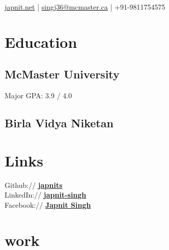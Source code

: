 \documentclass[]{deedy-resume-openfont}
\begin{document}
%
%
\lastupdated

%
%
 { \href{http://japnit.net}{japnit.net} | 
\href{mailto:singj36@mcmaster.ca}{singj36@mcmaster.ca} | +91-9811754575 
}

%
%

\begin{minipage}[t]{0.33\textwidth} 


\section{{\color{red}Education}}
\smallskip
\subsection{McMaster University}
Major GPA: 3.9 / 4.0
\sectionsep

\subsection{Birla Vidya Niketan}




\section{\color{red}Links} 
\smallskip
Github:// \href{https://github.com/japnits}{\bf japnits} \\
LinkedIn://  \href{https://www.linkedin.com/in/japnit-singh}{\bf japnit-singh} \\
Facebook://  \href{https://www.facebook.com/japnit.singh.583}{\bf Japnit Singh}



\section{\color{red}{Course}work  }


\end{minipage}
\end{document}
